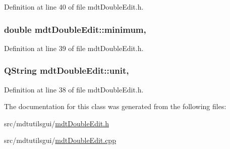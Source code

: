 Definition at line 40 of file mdt\-Double\-Edit.\-h.

\hypertarget{classmdt_double_edit_adc63b2b7f47fac62e44673d51444776e}{
\subsubsection[{minimum}]{\setlength{\rightskip}{0pt plus 5cm}double mdt\-Double\-Edit\-::minimum\hspace{0.3cm}{\ttfamily [read]}, {\ttfamily [write]}}}\label{classmdt_double_edit_adc63b2b7f47fac62e44673d51444776e}


Definition at line 39 of file mdt\-Double\-Edit.\-h.

\hypertarget{classmdt_double_edit_a163c58477dc88637f999f56714df74ee}{
\subsubsection[{unit}]{\setlength{\rightskip}{0pt plus 5cm}Q\-String mdt\-Double\-Edit\-::unit\hspace{0.3cm}{\ttfamily [read]}, {\ttfamily [write]}}}\label{classmdt_double_edit_a163c58477dc88637f999f56714df74ee}


Definition at line 38 of file mdt\-Double\-Edit.\-h.



The documentation for this class was generated from the following files\-:\begin{DoxyCompactItemize}
\item 
src/mdtutilsgui/\hyperlink{mdt_double_edit_8h}{mdt\-Double\-Edit.\-h}\item 
src/mdtutilsgui/\hyperlink{mdt_double_edit_8cpp}{mdt\-Double\-Edit.\-cpp}\end{DoxyCompactItemize}
